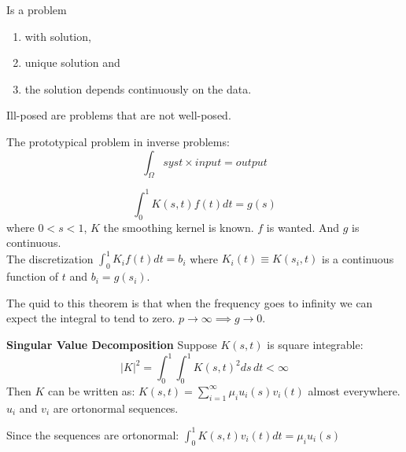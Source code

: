\begin{ddef}
Is a problem 
\begin{enumerate}[(1)]
    \item with solution, 
    \item unique solution and 
    \item the solution depends continuously on the data. 
\end{enumerate}
        Ill-posed are problems that are not well-posed.
\end{ddef}

\begin{remarks}
The prototypical problem in inverse problems:
    $$\int_\Omega syst \times input = output$$
\end{remarks}

\begin{ddef}
$$\int_0^1 K(s,t) f(t) dt = g(s) $$  
where $0<s<1$, $K$ the smoothing kernel is known. $f$ is wanted. And $g$ is continuous.\\
The discretization $\int_0^1 K_i f(t) dt =b_i$ where $K_i(t) \equiv K(s_i,t)$ is a continuous function of $t$ and $b_i=g(s_i)$. 
\end{ddef}  

\begin{teorema}
The quid to this theorem is that when the frequency goes to infinity we can expect the integral to tend to zero. $p\to \infty \implies g\to 0$.
\end{teorema}

\begin{ddef}
\textbf{Singular Value Decomposition}
Suppose $K(s,t)$ is square integrable: $$ |K|^2 = \int_0^1 \int_0^1 K(s,t)^2 ds\, dt<\infty$$ 
Then $K$ can be written as: $K(s,t)=\sum_{i=1}^\infty \mu_i u_i(s)v_i(t)$ almost everywhere. $u_i$ and $v_i$ are ortonormal sequences.
\end{ddef}

\begin{ddef}
Since the sequences are ortonormal: $\int_0^1 K(s,t)v_i(t) dt = \mu_i u_i(s)$
\end{ddef}
